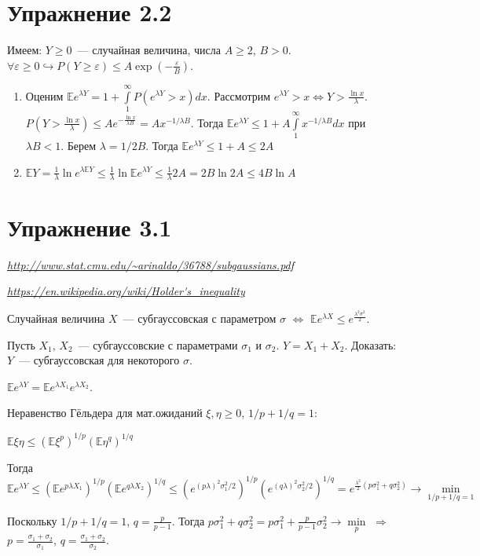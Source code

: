 \documentclass[a4paper]{article}
\def\eps{\varepsilon}
\begin{document}
\section*{Упражнение 2.2}
Имеем: $Y\geqslant 0$~--- случайная величина, числа $A\geqslant 2$, $B>0$. $\forall \eps\geqslant 0\hookrightarrow P(Y\geqslant \eps)\leqslant A\exp(-\frac{\eps}{B})$.
\begin{enumerate}
\item Оценим $\mathbb{E}e^{\lambda Y}=1+\int\limits_1^\infty P(e^{\lambda Y}>x)dx$. Рассмотрим $e^{\lambda Y}>x\Leftrightarrow Y>\frac{\ln x}{\lambda}$. $P(Y>\frac{\ln x}{\lambda})\leqslant Ae^{-\frac{\ln x}{\lambda B}}=Ax^{-1/\lambda B}$. Тогда $\mathbb{E}e^{\lambda Y}\leqslant 1+A\int\limits_1^\infty x^{-1/\lambda B}dx$ при $\lambda B<1$. Берем $\lambda=1/2B$. Тогда $\mathbb{E}e^{\lambda Y}\leqslant 1+A\leqslant 2A$
\item $\mathbb{E}Y=\frac{1}{\lambda}\ln e^{\lambda \mathbb{E}Y}\leqslant \frac{1}{\lambda}\ln \mathbb{E} e^{\lambda Y}\leqslant \frac{1}{\lambda}2A=2B\ln 2A\leqslant \boxed{4B\ln A}$
\end{enumerate}
\section*{Упражнение 3.1}
{\em \url{http://www.stat.cmu.edu/~arinaldo/36788/subgaussians.pdf}}

{\em \url{https://en.wikipedia.org/wiki/Holder's_inequality}}

Случайная величина $X$~--- субгауссовская с параметром $\sigma$ $\Leftrightarrow$ $\mathbb{E}e^{\lambda X}\leqslant e^{\frac{\lambda^2\sigma^2}{2}}$.

Пусть $X_1,\,X_2$~--- субгауссовские с параметрами $\sigma_1$ и $\sigma_2$. $Y=X_1+X_2$. Доказать: $Y$~--- субгауссовская для некоторого $\sigma$.

$\mathbb{E}e^{\lambda Y}=\mathbb{E}e^{\lambda X_1}e^{\lambda X_2}$.

Неравенство Гёльдера для мат.ожиданий $\xi,\eta\geqslant 0$, $1/p+1/q=1$:

$\mathbb{E}\xi\eta\leqslant (\mathbb{E}\xi^p)^{1/p}(\mathbb{E}\eta^q)^{1/q}$

Тогда $\mathbb{E}e^{\lambda Y}\leqslant (\mathbb{E}e^{p\lambda X_1})^{1/p}(\mathbb{E}e^{q\lambda X_2})^{1/q}\leqslant (e^{(p\lambda)^2\sigma_1^2/2})^{1/p}(e^{(q\lambda)^2\sigma_2^2/2})^{1/q}=e^{\frac{\lambda^2}{2}(p\sigma_1^2+q\sigma_2^2)}\to\min\limits_{1/p+1/q=1}$

Поскольку $1/p+1/q=1$, $q=\frac{p}{p-1}$. Тогда $p\sigma_1^2+q\sigma_2^2=p\sigma_1^2+\frac{p}{p-1}\sigma_2^2\to\min\limits_p$ $\Rightarrow$ $p=\frac{\sigma_1+\sigma_2}{\sigma_1}$, $q=\frac{\sigma_1+\sigma_2}{\sigma_2}$.
\end{document}
